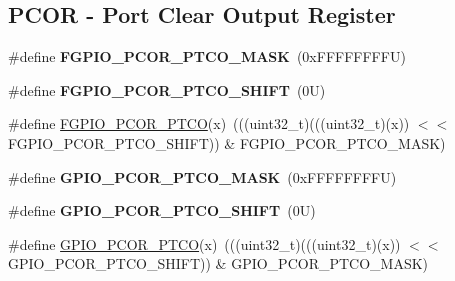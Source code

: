\subsection*{P\+C\+OR -\/ Port Clear Output Register}
\begin{DoxyCompactItemize}
\item 
\mbox{\label{group___f_g_p_i_o___register___masks_ga07265e812fba9f953394d6e9dfe82aab}} 
\#define {\bfseries F\+G\+P\+I\+O\+\_\+\+P\+C\+O\+R\+\_\+\+P\+T\+C\+O\+\_\+\+M\+A\+SK}~(0x\+F\+F\+F\+F\+F\+F\+F\+F\+U)
\item 
\mbox{\label{group___f_g_p_i_o___register___masks_gaa72cbc41d1494dfea7662eede74ee2a1}} 
\#define {\bfseries F\+G\+P\+I\+O\+\_\+\+P\+C\+O\+R\+\_\+\+P\+T\+C\+O\+\_\+\+S\+H\+I\+FT}~(0\+U)
\item 
\#define \mbox{\hyperlink{group___f_g_p_i_o___register___masks_ga3e6a01871116d6b24b154bd78ff62963}{F\+G\+P\+I\+O\+\_\+\+P\+C\+O\+R\+\_\+\+P\+T\+CO}}(x)~(((uint32\+\_\+t)(((uint32\+\_\+t)(x)) $<$$<$ F\+G\+P\+I\+O\+\_\+\+P\+C\+O\+R\+\_\+\+P\+T\+C\+O\+\_\+\+S\+H\+I\+FT)) \& F\+G\+P\+I\+O\+\_\+\+P\+C\+O\+R\+\_\+\+P\+T\+C\+O\+\_\+\+M\+A\+SK)
\item 
\mbox{\label{group___f_g_p_i_o___register___masks_ga0b8378768ee61ea2c685a1687c90fa03}} 
\#define {\bfseries G\+P\+I\+O\+\_\+\+P\+C\+O\+R\+\_\+\+P\+T\+C\+O\+\_\+\+M\+A\+SK}~(0x\+F\+F\+F\+F\+F\+F\+F\+F\+U)
\item 
\mbox{\label{group___f_g_p_i_o___register___masks_ga5c9203b830cbd86cd8d0189872b5c772}} 
\#define {\bfseries G\+P\+I\+O\+\_\+\+P\+C\+O\+R\+\_\+\+P\+T\+C\+O\+\_\+\+S\+H\+I\+FT}~(0\+U)
\item 
\#define \mbox{\hyperlink{group___f_g_p_i_o___register___masks_ga3a9c3710923cd50fc2df4e678180eb1d}{G\+P\+I\+O\+\_\+\+P\+C\+O\+R\+\_\+\+P\+T\+CO}}(x)~(((uint32\+\_\+t)(((uint32\+\_\+t)(x)) $<$$<$ G\+P\+I\+O\+\_\+\+P\+C\+O\+R\+\_\+\+P\+T\+C\+O\+\_\+\+S\+H\+I\+FT)) \& G\+P\+I\+O\+\_\+\+P\+C\+O\+R\+\_\+\+P\+T\+C\+O\+\_\+\+M\+A\+SK)
\end{DoxyCompactItemize}
